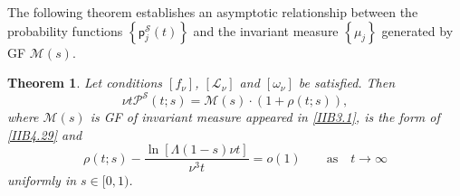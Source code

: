\documentclass[10pt,reqno]{amsart}
\newtheorem{theorem}{Theorem}
\theoremstyle{definition}
\numberwithin{equation}{section}
\begin{document}
    The following theorem establishes an asymptotic relationship between the probability
    functions $\left\{\textsf{p}_{j}^{\mathcal{S}}(t)\right\}$ and the invariant measure
    $\left\{{{\mu}_{j}}\right\}$ generated by GF $\mathcal{M}(s)$.
\begin{theorem}                      \label{IIBTh8}
    Let conditions $[{f}_{\nu}]$, $[{\mathcal{L}}_{\nu}]$ and $[{\omega}_{\nu}]$ be satisfied. Then
\begin{equation}                  \label{IIB4.35}
    \nu{t}{{\mathcal{P}}^{\mathcal{S}}}(t;s)=\mathcal{M}(s)\cdot\left(1+\rho(t;s)\right),
\end{equation}
    where $\mathcal{M}(s)$ is GF of invariant measure appeared in {\eqref{IIB3.1}},
    is the form of {\eqref{IIB4.29}} and
\[
    \rho(t;s)-\frac{\ln\left[\Lambda(1-s)\nu{t} \right]}{{{\nu}^{3}}t}=o(1)
    \qquad {\text{as}} \quad {t\to\infty}
\]
    uniformly in $s\in[0,1)$.
\end{theorem}
\end{document}
